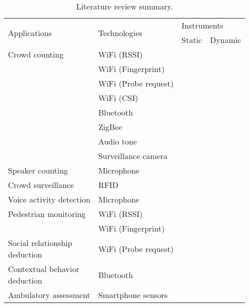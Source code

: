 \begin{table}[h]
\begin{adjustwidth}{-2cm}{}
\centering
\caption{Literature review summary.}
\label{tab:literature-summary}
\begin{tabular}{llll}
\toprule
\multirow{2}{*}{Applications} & \multirow{2}{*}{Technologies} & \multicolumn{2}{l}{Instruments} \\ \cline{3-4}
                              &                               & Static         & Dynamic        \\ \midrule
Crowd counting         & WiFi (\ac{RSSI}) & \cite{,thesis046,thesis053,thesis012,thesis052} & \\
					   & WiFi (Fingerprint) & \cite{thesis045,thesis020}&                \\
					   & WiFi (Probe request) & \cite{thesis047}&\cite{thesis057}\\
					   & WiFi (\ac{CSI}) & \cite{thesis051,thesis006}&                \\
					   & Bluetooth & \cite{thesis016}&\cite{thesis041,thesis008}\\
					   & ZigBee & \cite{thesis042,thesis043} & \\
					   & Audio tone & & \cite{thesis044}\\
					   & Surveillance camera & \cite{thesis055,thesis034} & \\
Speaker counting       & Microphone & & \cite{thesis071,thesis074,thesis067}\\
Crowd surveillance     & RFID & \cite{thesis050} & \\
Voice activity detection & Microphone & & \cite{thesis070}\\
Pedestrian monitoring  & WiFi (\ac{RSSI}) & \cite{thesis017,thesis011}&                \\
					   & WiFi (Fingerprint) & \cite{thesis033}&                \\
\specialcellleft{Social relationship\\deduction} & WiFi (Probe request) & \cite{thesis014}& \\
\specialcellleft{Contextual behavior\\deduction} & Bluetooth & & \cite{thesis028} \\
Ambulatory assessment & Smartphone sensors &                & \cite{thesis031,thesis001,thesis015,thesis030}\\ \bottomrule
\end{tabular}
\end{adjustwidth}
\end{table}

